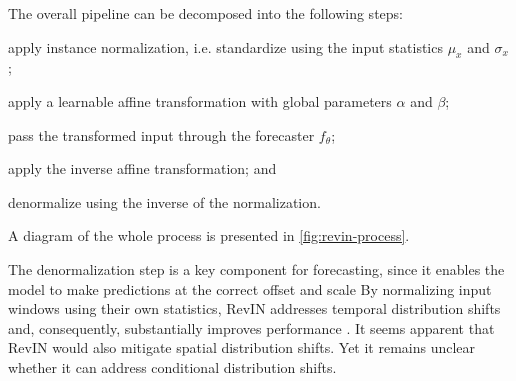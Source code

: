 The overall pipeline can be decomposed into the following steps:
\begin{enumerate*}[(a)]
    \item apply instance normalization, i.e. standardize using the input statistics $\mu_x$ and $\sigma_x$;
    \item apply a learnable affine transformation with global parameters $\alpha$ and $\beta$;
    \item pass the transformed %
    input through the forecaster $f_{\theta}$;
    \item apply the inverse affine transformation; and
    \item denormalize using the inverse of the normalization.
\end{enumerate*} A diagram of the whole process is presented in \cref{fig:revin-process}.



The denormalization step is a key component for forecasting, since it enables the model to make predictions at the correct offset and scale
By normalizing input windows using their own statistics, RevIN addresses temporal distribution shifts and, consequently, substantially  improves performance \citep{revin}. It seems apparent that RevIN would also mitigate spatial distribution shifts. Yet it remains unclear whether it can address conditional distribution shifts.

\label{extensions}
